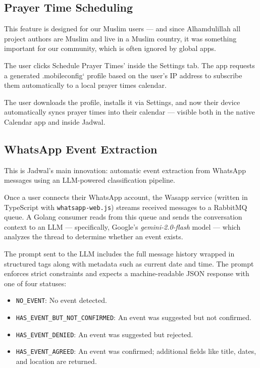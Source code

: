 \subsection{Prayer Time Scheduling} \label{subsec:schedule-prayer-times}

This feature is designed for our Muslim users — and since Alhamdulillah all project authors are Muslim and live in a Muslim country, it was something important for our community, which is often ignored by global apps.

The user clicks Schedule Prayer Times' inside the Settings tab. The app requests a generated .mobileconfig` profile based on the user's IP address to subscribe them automatically to a local prayer times calendar.

The user downloads the profile, installs it via Settings, and now their device automatically syncs prayer times into their calendar — visible both in the native Calendar app and inside Jadwal.

\subsection{WhatsApp Event Extraction} \label{subsec:whatsapp-event-extraction}

This is Jadwal's main innovation: automatic event extraction from WhatsApp messages using an LLM-powered classification pipeline.

Once a user connects their WhatsApp account, the Wasapp service (written in TypeScript with \texttt{whatsapp-web.js}) streams received messages to a RabbitMQ queue. A Golang consumer reads from this queue and sends the conversation context to an LLM — specifically, Google’s \textit{gemini-2.0-flash} model — which analyzes the thread to determine whether an event exists.

The prompt sent to the LLM includes the full message history wrapped in structured tags along with metadata such as current date and time. The prompt enforces strict constraints and expects a machine-readable JSON response with one of four statuses:

\begin{itemize}
    \item \texttt{NO\_EVENT}: No event detected.
    \item \texttt{HAS\_EVENT\_BUT\_NOT\_CONFIRMED}: An event was suggested but not confirmed.
    \item \texttt{HAS\_EVENT\_DENIED}: An event was suggested but rejected.
    \item \texttt{HAS\_EVENT\_AGREED}: An event was confirmed; additional fields like title, dates, and location are returned.
\end{itemize}

